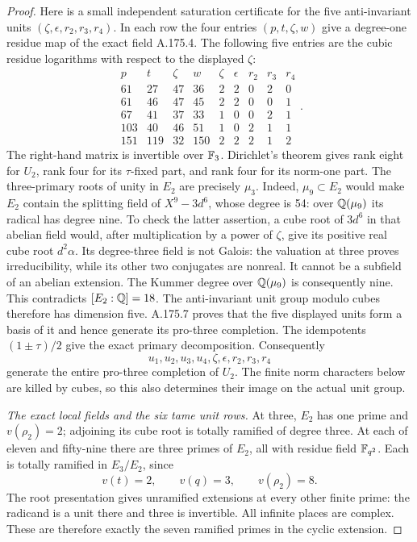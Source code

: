 \begin{proof}
Here is a small independent saturation certificate for the five
anti-invariant units $(\zeta,\epsilon,r_2,r_3,r_4)$.
In each row the four entries $(p,t,\zeta,w)$ give a degree-one residue
map of the exact field A.175.4.  The following five entries are the
cubic residue logarithms with respect to the displayed $\zeta$:
\[
 \begin{array}{rrrr|rrrrr}
 p&t&\zeta&w&\zeta&\epsilon&r_2&r_3&r_4\\ \hline
 61&27&47&36&2&2&0&2&0\\
 61&46&47&45&2&2&0&0&1\\
 67&41&37&33&1&0&0&2&1\\
 103&40&46&51&1&0&2&1&1\\
 151&119&32&150&2&2&2&1&2
 \end{array}.
\tag{A.175.7}
\]
The right-hand matrix is invertible over $\mathbb F_3$.
Dirichlet's theorem gives rank eight for $U_2$, rank four for its
$\tau$-fixed part, and rank four for its norm-one part.  The
three-primary roots of unity in $E_2$ are precisely $\mu_3$.
Indeed, $\mu_9\subset E_2$ would make $E_2$ contain the splitting
field of $X^9-3d^6$, whose degree is 54: over $\mathbb Q(\mu_9)$ its
radical has degree nine.  To check the latter assertion, a cube
root of $3d^6$ in that abelian field would, after multiplication
by a power of $\zeta$, give its positive real cube root $d^2\alpha$.
Its degree-three field is not Galois: the valuation at three proves
irreducibility, while its other two conjugates are nonreal.
It cannot be a subfield of an abelian extension.  The Kummer
degree over $\mathbb Q(\mu_9)$ is consequently nine.  This contradicts
$[E_2:\mathbb Q]=18$.
The anti-invariant unit group modulo cubes therefore has dimension
five.  A.175.7 proves that the five displayed units form a basis of
it and hence generate its pro-three completion.  The idempotents
$(1\pm\tau)/2$ give the exact primary decomposition.  Consequently
\[
 u_1,u_2,u_3,u_4,\zeta,\epsilon,r_2,r_3,r_4
\tag{A.175.8}
\]
generate the entire pro-three completion of $U_2$.
The finite norm characters below are killed by cubes, so this also
determines their image on the actual unit group.

\emph{The exact local fields and the six tame unit rows.}
At three, $E_2$ has one prime and $v(\rho_2)=2$; adjoining its cube
root is totally ramified of degree three.  At each of eleven and
fifty-nine there are three primes of $E_2$, all with residue field
$\mathbb F_{q^2}$.  Each is totally ramified in $E_3/E_2$, since
\[
 v(t)=2,\qquad v(q)=3,\qquad v(\rho_2)=8.
\tag{A.175.9}
\]
The root presentation gives unramified extensions at every other
finite prime: the radicand is a unit there and three is invertible.
All infinite places are complex.  These are therefore exactly the
seven ramified primes in the cyclic extension.


\end{proof}
